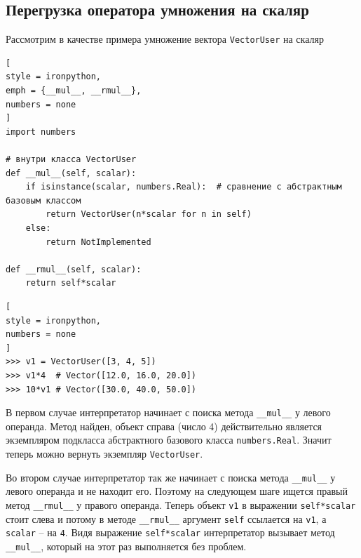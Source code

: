\documentclass[%
	11pt,
	a4paper,
	utf8,
		]{article}
\begin{document}

\subsection{Перегрузка оператора умножения на скаляр}

Рассмотрим в качестве примера умножение вектора \texttt{VectorUser} на скаляр

\begin{lstlisting}[
style = ironpython,
emph = {__mul__, __rmul__},
numbers = none
]
import numbers

# внутри класса VectorUser
def __mul__(self, scalar):
    if isinstance(scalar, numbers.Real):  # сравнение с абстрактным базовым классом
        return VectorUser(n*scalar for n in self)
    else:
        return NotImplemented

def __rmul__(self, scalar):
    return self*scalar
\end{lstlisting}

\begin{lstlisting}[
style = ironpython,
numbers = none
]
>>> v1 = VectorUser([3, 4, 5])
>>> v1*4  # Vector([12.0, 16.0, 20.0])
>>> 10*v1 # Vector([30.0, 40.0, 50.0])
\end{lstlisting}

В первом случае интерпретатор начинает с поиска метода \texttt{\_\_mul\_\_} у левого операнда. Метод найден, объект справа (число 4) действительно является экземпляром подкласса абстрактного базового класса \texttt{numbers.Real}. Значит теперь можно вернуть экземпляр \texttt{VectorUser}.

Во втором случае интерпретатор так же начинает с поиска метода \texttt{\_\_mul\_\_} у левого операнда и не находит его. Поэтому на следующем шаге ищется правый метод \texttt{\_\_rmul\_\_} у правого операнда. Теперь объект \texttt{v1} в выражении \texttt{self*scalar} стоит слева и потому в методе \texttt{\_\_rmul\_\_} аргумент \texttt{self} ссылается на \texttt{v1}, а \texttt{scalar} -- на \texttt{4}. Видя выражение \texttt{self*scalar} интерпретатор вызывает метод \texttt{\_\_mul\_\_}, который на этот раз выполняется без проблем.
\end{document}
